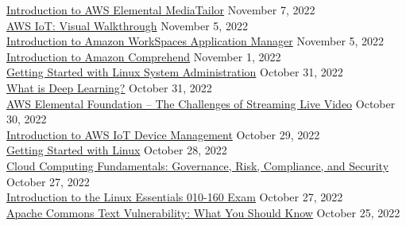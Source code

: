\documentclass[10pt]{res} %
\begin{document}
\begin{resume}
\href{https://bjdelacruz.dev/files/certificates/pluralsight/Introduction_to_AWS_Elemental_MediaTailor.pdf}{\color{blue}Introduction to AWS Elemental MediaTailor} \hfill November 7, 2022 \\
\href{https://bjdelacruz.dev/files/certificates/pluralsight/AWS_IoT_Visual_Walkthrough.pdf}{\color{blue}AWS IoT: Visual Walkthrough} \hfill November 5, 2022 \\
\href{https://bjdelacruz.dev/files/certificates/pluralsight/Introduction_to_Amazon_WorkSpaces_Application_Manager.pdf}{\color{blue}Introduction to Amazon WorkSpaces Application Manager} \hfill November 5, 2022 \\
\href{https://bjdelacruz.dev/files/certificates/pluralsight/Introduction_to_Amazon_Comprehend.pdf}{\color{blue}Introduction to Amazon Comprehend} \hfill November 1, 2022 \\
\href{https://bjdelacruz.dev/files/certificates/pluralsight/4_Getting_Started_with_Linux_System_Administration.pdf}{\color{blue}Getting Started with Linux System Administration} \hfill October 31, 2022 \\
\href{https://bjdelacruz.dev/files/certificates/pluralsight/What_is_Deep_Learning.pdf}{\color{blue}What is Deep Learning?} \hfill October 31, 2022 \\
\href{https://bjdelacruz.dev/files/certificates/pluralsight/AWS_Elemental_Foundation_The_Challenges_of_Streaming_Live_Video.pdf}{\color{blue}AWS Elemental Foundation -- The Challenges of Streaming Live Video} \hfill October 30, 2022 \\
\href{https://bjdelacruz.dev/files/certificates/pluralsight/Introduction_to_AWS_IoT_Device_Management.pdf}{\color{blue}Introduction to AWS IoT Device Management} \hfill October 29, 2022 \\
\href{https://bjdelacruz.dev/files/certificates/pluralsight/2_Getting_Started_with_Linux.pdf}{\color{blue}Getting Started with Linux} \hfill October 28, 2022 \\
\href{https://bjdelacruz.dev/files/certificates/pluralsight/4_Cloud_Computing_Fundamentals_Governance_Risk_Compliance_and_Security.pdf}{\color{blue}Cloud Computing Fundamentals: Governance, Risk, Compliance, and Security} \hfill October 27, 2022 \\
\href{https://bjdelacruz.dev/files/certificates/pluralsight/1_Introduction_to_the_Linux_Essentials_010_160_Exam.pdf}{\color{blue}Introduction to the Linux Essentials 010-160 Exam} \hfill October 27, 2022 \\
\href{https://bjdelacruz.dev/files/certificates/pluralsight/9_Apache_Commons_Text_Vulnerability_What_You_Should_Know.pdf}{\color{blue}Apache Commons Text Vulnerability: What You Should Know} \hfill October 25, 2022 \\

\end{resume}
\end{document}
